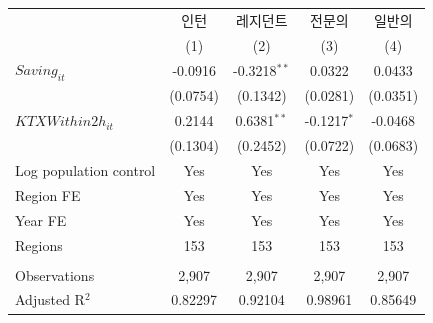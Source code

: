 \begingroup
\centering
\begin{tabular}{lcccc}
   \toprule
                          & 인턴     & 레지던트       & 전문의        & 일반의 \\   
                          & (1)      & (2)            & (3)           & (4)\\  
   \midrule 
   $Saving_{it}$          & -0.0916  & -0.3218$^{**}$ & 0.0322        & 0.0433\\   
                          & (0.0754) & (0.1342)       & (0.0281)      & (0.0351)\\   
   $KTXWithin2h_{it}$     & 0.2144   & 0.6381$^{**}$  & -0.1217$^{*}$ & -0.0468\\   
                          & (0.1304) & (0.2452)       & (0.0722)      & (0.0683)\\   
   Log population control & Yes      & Yes            & Yes           & Yes\\  
   Region FE              & Yes      & Yes            & Yes           & Yes\\  
   Year FE                & Yes      & Yes            & Yes           & Yes\\  
   Regions                & 153      & 153            & 153           & 153\\  
    \\
   Observations           & 2,907    & 2,907          & 2,907         & 2,907\\  
   Adjusted R$^2$         & 0.82297  & 0.92104        & 0.98961       & 0.85649\\  
   \bottomrule
\end{tabular}
\par\endgroup
